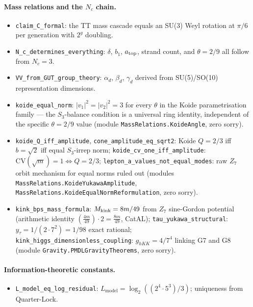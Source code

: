 \documentclass[11pt]{article}
\theoremstyle{remark}
\begin{document}
\begin{appendices}
\paragraph{Mass relations and the $N_c$ chain.}
\begin{itemize}[leftmargin=1.2em,itemsep=0.1em,topsep=0.2em]
  \item \texttt{claim\_C\_formal}: the TT mass cascade equals an SU(3) Weyl rotation at $\pi/6$ per generation with $2^g$ doubling.
  \item \texttt{N\_c\_determines\_everything}: $\delta$, $b_1$, $a_{\rm top}$, strand count, and $\theta = 2/9$ all follow from $N_c = 3$.
  \item \texttt{VV\_from\_GUT\_group\_theory}: $\alpha_d$, $\beta_d$, $\gamma_d$ derived from SU(5)/SO(10) representation dimensions.
  \item \texttt{koide\_equal\_norm}: $|v_1|^2 = |v_2|^2 = 3$ for every $\theta$ in the Koide parametrisation family --- the $S_3$-balance condition is a universal ring identity, independent of the specific $\theta = 2/9$ value (module \texttt{MassRelations.KoideAngle}, zero sorry).
  \item \texttt{koide\allowbreak\_Q\allowbreak\_iff\allowbreak\_amplitude}, \texttt{cone\allowbreak\_amplitude\allowbreak\_eq\allowbreak\_sqrt2}: Koide $Q=2/3$ iff $b=\sqrt{2}$ iff equal $S_3$-irrep norm; \texttt{koide\allowbreak\_cv\allowbreak\_one\allowbreak\_iff\allowbreak\_amplitude}: $\mathrm{CV}(\sqrt{m})=1 \Leftrightarrow Q=2/3$; \texttt{lepton\allowbreak\_a\allowbreak\_values\allowbreak\_not\allowbreak\_equal\allowbreak\_modes}: raw $Z_7$ orbit mechanism for equal norms ruled out (modules \texttt{MassRelations.\allowbreak{}KoideYukawaAmplitude}, \texttt{MassRelations.\allowbreak{}KoideEqualNormReformulation}, zero sorry).
  \item \texttt{kink\_bps\_mass\_formula}: $M_{\rm kink} = 8m/49$ from $Z_7$ sine-Gordon potential (arithmetic identity $(\frac{4m}{49})\cdot 2 = \frac{8m}{49}$, CatAL); \texttt{tau\_yukawa\_structural}: $y_\tau = 1/(2\cdot 7^2) = 1/98$ exact rational; \texttt{kink\_higgs\_dimensionless\_coupling}: $g_{hKK} = 4/7^4$ linking G7 and G8 (module \texttt{Gravity.PMDLGravityTheorems}, zero sorry).
\end{itemize}

\paragraph{Information-theoretic constants.}
\begin{itemize}[leftmargin=1.2em,itemsep=0.1em,topsep=0.2em]
  \item \texttt{L\_model\_eq\_log\_residual}: $L_{\mathrm{model}} = \log_2((2^4 \cdot 5^3)/3)$; uniqueness from Quarter-Lock.
\end{itemize}


\end{appendices}
\end{document}
